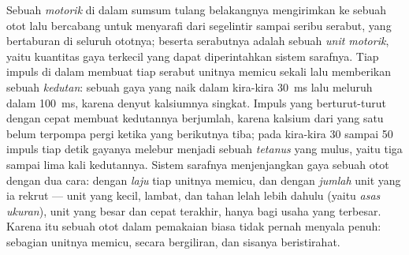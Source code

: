\begin{definition}\label{def:b2:muscle-movement:motorunit}
Sebuah \emph{ motorik} di dalam sumsum tulang belakangnya
mengirimkan  ke sebuah otot lalu bercabang untuk menyarafi dari
segelintir sampai seribu serabut, yang bertaburan di seluruh ototnya;
 beserta serabutnya adalah sebuah \emph{unit motorik}, yaitu
kuantitas gaya terkecil yang dapat diperintahkan sistem sarafnya. Tiap
impuls di dalam  membuat tiap serabut unitnya memicu sekali
lalu memberikan sebuah \emph{kedutan}: sebuah gaya yang naik dalam
kira-kira \qty{30}{ms} lalu meluruh dalam \qty{100}{ms}, karena denyut
kalsiumnya singkat. Impuls yang berturut-turut dengan cepat membuat
kedutannya berjumlah, karena kalsium dari yang satu belum terpompa
pergi ketika yang berikutnya tiba; pada kira-kira 30 sampai 50 impuls
tiap detik gayanya melebur menjadi sebuah \emph{tetanus} yang mulus,
yaitu tiga sampai lima kali kedutannya. Sistem sarafnya menjenjangkan
gaya sebuah otot dengan dua cara: dengan \emph{laju} tiap unitnya
memicu, dan dengan \emph{jumlah} unit yang ia rekrut --- unit yang
kecil, lambat, dan tahan lelah lebih dahulu (yaitu \emph{asas
ukuran}), unit yang besar dan cepat terakhir, hanya bagi usaha yang
terbesar. Karena itu sebuah otot dalam pemakaian biasa tidak pernah
menyala penuh: sebagian unitnya memicu, secara bergiliran, dan sisanya
beristirahat.
\end{definition}

